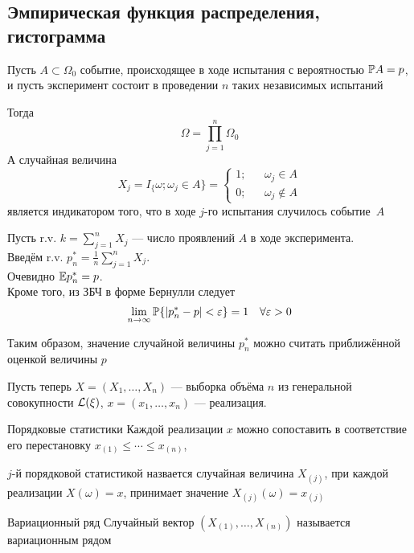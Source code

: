 \subsection{Эмпирическая функция распределения, гистограмма}

Пусть $A\subset\Omega_0$ событие,
происходящее в ходе испытания с вероятностью $\mathbb P A = p$,
и пусть эксперимент состоит в проведении $n$ таких независимых испытаний

Тогда
$$\Omega = \prod_{j=1}^n \Omega_0$$
А случайная величина
$$X_j =
I_\{\omega ; \omega_j \in A\} =
\left\{
\begin{aligned}
1; && \omega_j\in A \\
0; && \omega_j\notin A
\end{aligned}\right.$$
является индикатором того, что в ходе $j$-го испытания случилось событие~$A$

Пусть r.v. $k = \sum_{j=1}^n X_j$ --- число проявлений $A$ в ходе эксперимента. \\
Введём r.v. $p_n^* = \frac{1}{n} \sum_{j=1}^n X_j$. \\
Очевидно $\mathbb E p_n^* = p$.\\
Кроме того, из ЗБЧ в форме Бернулли следует
$$\lim_{n\to\infty} \mathbb P\{ |p_n^* - p| < \varepsilon \} = 1 \quad \forall\varepsilon>0$$

Таким образом, значение случайной величины $p_n^*$
можно считать приближённой оценкой величины $p$


Пусть теперь
$X = (X_1, \dotsc, X_n)$ --- выборка объёма $n$ из генеральной совокупности $\mathcal L(\xi)$,
$x = (x_1, \dotsc, x_n)$ --- реализация.

\begin{dfn}{Порядковые статистики}
Каждой реализации $x$ можно сопоставить в соответствие его перестановку
$x_{(1)} \leq \dotsb \leq x_{(n)}$,

$j$-й порядковой статистикой назвается
случайная величина $X_{(j)}$,
при каждой реализации $X(\omega)=x$,
принимает значение $X_{(j)}(\omega) = x_{(j)}$
\end{dfn}

\begin{dfn}{Вариационный ряд}
Случайный вектор $(X_{(1)}, \dotsc, X_{(n)})$ называется вариационным рядом
\end{dfn}

